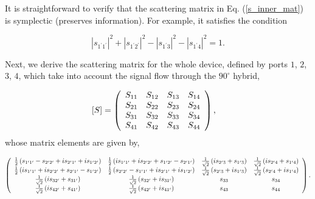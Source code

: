 \documentclass[aip,onecolumn,10pt]{revtex4}%
\begin{document}
It is straightforward to verify that the scattering matrix in Eq. (\ref{s_inner_mat}) is symplectic (preserves information). For example, it satisfies the condition

\begin{equation}
\left\vert s_{1^{\prime}1^{\prime}}\right\vert ^{2}+\left\vert s_{1^{\prime
	}2^{\prime}}\right\vert ^{2}-\left\vert s_{1^{\prime}3}\right\vert
^{2}-\left\vert s_{1^{\prime}4}\right\vert ^{2}=1.
\end{equation} 

Next, we derive the scattering matrix for the whole device, defined by ports $1$, $2$, $3$, $4$, which take into account the signal flow through the $90^{\circ}$ hybrid, 

\begin{align}
\left[  S\right]    & =
\left(
\begin{array}
[c]{cccc}%
S_{11} & S_{12} & S_{13} & S_{14}\\
S_{21} & S_{22} & S_{23} & S_{24}\\
S_{31} & S_{32} & S_{33} & S_{34}\\
S_{41} & S_{42} & S_{43} & S_{44}%
\end{array}
\right),
\end{align}
whose matrix elements are given by,

\begin{align}
\left(
\begin{array}
[c]{cccc}%
\frac{1}{2}\left(  s_{1^{\prime}1^{\prime}}-s_{2^{\prime}2^{\prime}%
}+is_{2^{\prime}1^{\prime}}+is_{1^{\prime}2^{\prime}}\right)   & \frac{1}%
{2}\left(  is_{1^{\prime}1^{\prime}}+is_{2^{\prime}2^{\prime}}+s_{1^{\prime
	}2^{\prime}}-s_{2^{\prime}1^{\prime}}\right)   & \frac{1}{\sqrt{2}}\left(
is_{2^{\prime}3}+s_{1^{\prime}3}\right)   & \frac{1}{\sqrt{2}}\left(
is_{2^{\prime}4}+s_{1^{\prime}4}\right)  \\
\frac{1}{2}\left(  is_{1^{\prime}1^{\prime}}+is_{2^{\prime}2^{\prime}%
}+s_{2^{\prime}1^{\prime}}-s_{1^{\prime}2^{\prime}}\right)   & \frac{1}%
{2}\left(  s_{2^{\prime}2^{\prime}}-s_{1^{\prime}1^{\prime}}+is_{2^{\prime
	}1^{\prime}}+is_{1^{\prime}2^{\prime}}\right)   & \frac{1}{\sqrt{2}}\left(
s_{2^{\prime}3}+is_{1^{\prime}3}\right)   & \frac{1}{\sqrt{2}}\left(
s_{2^{\prime}4}+is_{1^{\prime}4}\right)  \\
\frac{1}{\sqrt{2}}\left(  is_{32^{\prime}}+s_{31^{\prime}}\right)   & \frac
{1}{\sqrt{2}}\left(  s_{32^{\prime}}+is_{31^{\prime}}\right)   & s_{33} &
s_{34}\\
\frac{1}{\sqrt{2}}\left(  is_{42^{\prime}}+s_{41^{\prime}}\right)   & \frac
{1}{\sqrt{2}}\left(  s_{42^{\prime}}+is_{41^{\prime}}\right)   & s_{43} &
s_{44}%
\end{array}
\right). 
\label{S_mat}%
\end{align}
\end{document}

